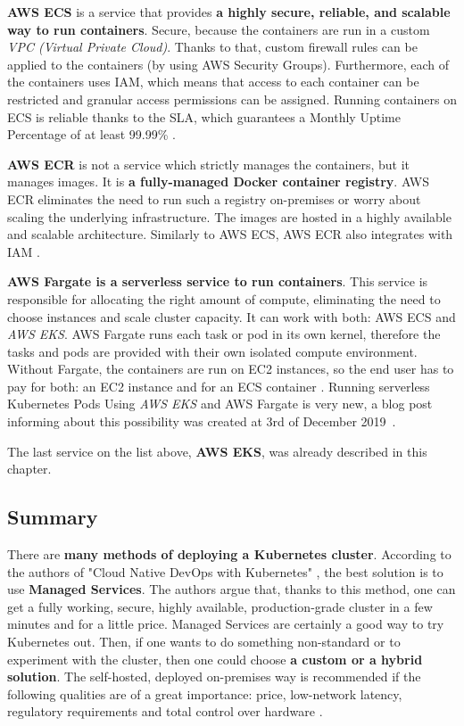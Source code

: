 \textbf{AWS ECS} is a service that provides \textbf{a highly secure, reliable, and scalable way to run containers}. Secure, because the containers are run in a custom \textit{VPC (Virtual Private Cloud)}. Thanks to that, custom firewall rules can be applied to the containers (by using AWS Security Groups). Furthermore, each of the containers uses IAM, which means that access to each container can be restricted and granular access permissions can be assigned. Running containers on ECS is reliable thanks to the SLA, which guarantees a Monthly Uptime Percentage of at least 99.99\% \cite{ecs}.

\textbf{AWS ECR} is not a service which strictly manages the containers, but it manages images. It is \textbf{a fully-managed Docker container registry}. AWS ECR eliminates the need to run such a registry on-premises or worry about scaling the underlying infrastructure. The images are hosted in a highly available and scalable architecture. Similarly to AWS ECS, AWS ECR also integrates with IAM \cite{ecr}.

\textbf{AWS Fargate is a serverless service to run containers}. This service is responsible for allocating the right amount of compute, eliminating the need to choose instances and scale cluster capacity. It can work with both: AWS ECS and \textit{AWS EKS}. AWS Fargate runs each task or pod in its own kernel, therefore the tasks and pods are provided with their own isolated compute environment. Without Fargate, the containers are run on EC2 instances, so the end user has to pay for both: an EC2 instance and for an ECS container \cite{fargate}. Running serverless Kubernetes Pods Using \textit{AWS EKS} and AWS Fargate is very new, a blog post informing about this possibility was created at 3rd of December 2019~\cite{fargate-for-eks}.

The last service on the list above, \textbf{AWS EKS}, was already described in this chapter.

\subsection{Summary}

There are \textbf{many methods of deploying a Kubernetes cluster}. According to the authors of "Cloud Native DevOps with Kubernetes" \cite{book-cndwk}, the best solution is to use \textbf{Managed Services}. The authors argue that, thanks to this method, one can get a fully working, secure, highly available, production-grade cluster in a few minutes and for a little price. Managed Services are certainly a good way to try Kubernetes out. Then, if one wants to do something non-standard or to experiment with the cluster, then one could choose \textbf{a custom or a hybrid solution}. The self-hosted, deployed on-premises way is recommended if the following qualities are of a great importance: price, low-network latency, regulatory requirements and total control over hardware \cite{book-mastering-k8s}.

